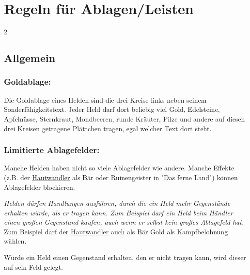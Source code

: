 \documentclass[10pt, a4paper, oneside]{book}
\newcommand{\fan}[1]{\textit{#1}}
\begin{document}
\chapter{Regeln für Ablagen/Leisten}
\label{Ablagen und Leisten}


\begin{multicols*}{2}\raggedcolumns

\section{Allgemein}


\begin{nobgcolor}

\subsection{Goldablage:}

Die Goldablage eines Helden sind die drei Kreise links neben seinem Sonderfähigkeitstext. Jeder Held darf dort beliebig viel Gold, Edelsteine, Apfelnüsse, Sternkraut, Mondbeeren, runde Kräuter, Pilze und andere auf diesen drei Kreisen getragene Plättchen tragen, egal welcher Text dort steht.








\subsection{Limitierte Ablagefelder:}

Manche Helden haben nicht so viele Ablagefelder wie andere. Manche Effekte (z.B. der \hyperref[Hautwandler]{Hautwandler} als Bär oder Ruinengeister in "Das ferne Land") können Ablagefelder blockieren.

\fan{Helden dürfen Handlungen ausführen, durch die ein Held mehr Gegenstände erhalten würde, als er tragen kann. Zum Beispiel darf ein Held beim Händler einen großen Gegenstand kaufen, auch wenn er selbst kein großes Ablagefeld hat.} Zum Beispiel darf der \hyperref[Hautwandler]{Hautwandler} auch als Bär Gold als Kampfbelohnung wählen.
\supercite{DH:FAQ}

Würde ein Held einen Gegenstand erhalten, den er nicht tragen kann, wird dieser auf sein Feld gelegt.
\supercite{DRidN:FAQ}


\end{nobgcolor}
\end{multicols*}
\end{document}
